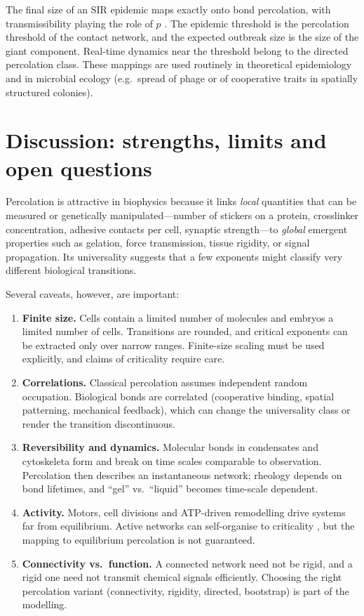 \documentclass[11pt]{article}
\begin{document}
The final size of an SIR epidemic maps exactly onto bond percolation, with transmissibility playing the role of $p$ \cite{Grassberger1983,Newman2002}. The epidemic threshold is the percolation threshold of the contact network, and the expected outbreak size is the size of the giant component. Real-time dynamics near the threshold belong to the directed percolation class. These mappings are used routinely in theoretical epidemiology and in microbial ecology (e.g.\ spread of phage or of cooperative traits in spatially structured colonies).

\section{Discussion: strengths, limits and open questions}\label{sec:discussion}

Percolation is attractive in biophysics because it links \emph{local} quantities that can be measured or genetically manipulated---number of stickers on a protein, crosslinker concentration, adhesive contacts per cell, synaptic strength---to \emph{global} emergent properties such as gelation, force transmission, tissue rigidity, or signal propagation. Its universality suggests that a few exponents might classify very different biological transitions.

Several caveats, however, are important:
\begin{enumerate}
\item \textbf{Finite size.} Cells contain a limited number of molecules and embryos a limited number of cells. Transitions are rounded, and critical exponents can be extracted only over narrow ranges. Finite-size scaling must be used explicitly, and claims of criticality require care.
\item \textbf{Correlations.} Classical percolation assumes independent random occupation. Biological bonds are correlated (cooperative binding, spatial patterning, mechanical feedback), which can change the universality class or render the transition discontinuous.
\item \textbf{Reversibility and dynamics.} Molecular bonds in condensates and cytoskeleta form and break on time scales comparable to observation. Percolation then describes an instantaneous network; rheology depends on bond lifetimes, and ``gel'' vs.\ ``liquid'' becomes time-scale dependent.
\item \textbf{Activity.} Motors, cell divisions and ATP-driven remodelling drive systems far from equilibrium. Active networks can self-organise to criticality \cite{Alvarado2013}, but the mapping to equilibrium percolation is not guaranteed.
\item \textbf{Connectivity vs.\ function.} A connected network need not be rigid, and a rigid one need not transmit chemical signals efficiently. Choosing the right percolation variant (connectivity, rigidity, directed, bootstrap) is part of the modelling.
\end{enumerate}
\end{document}
